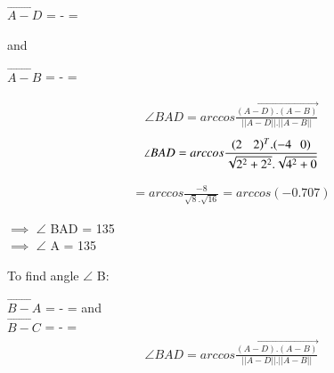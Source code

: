 \documentclass[journal,10pt,twocolumn]{article}
\begin{document}
\begin{flushleft}
\begin{center}
    

$\vec{A-D}$ =  - 
	= 

\begin{flushleft}
and \\
\end{flushleft}


$\vec{A-B}$ =  - = 
	\\

\end{center}
\vspace{0.4cm}
\begin{align}
\angle BAD = arccos \vec{\frac{(A-D).(A-B)}{||A-D ||. ||A-B||}}
\end{align}
\vspace{0.4cm}
\begin{align}
\angle BAD = arccos \frac{(2 \hspace{0.32cm}  2)^T . (-4 \hspace{0.25cm}   0) } {\sqrt{2^2+2^2}.\sqrt{4^2+0}}
\end{align}

\begin{align}
= arccos \frac{-8 } {\sqrt{8}.\sqrt{16}} = arccos (-0.707) 
\end{align}
\begin{flushleft}
$\implies$   $\angle$ BAD = 135 \textdegree\\
\vspace{0.3cm}
$\implies$   $\angle$ A = 135 \textdegree
\end{flushleft}

\vspace{0.5cm}
\begin{flushleft}
To find angle $\angle$ B: \\
\end{flushleft}

\vspace{0.35cm}
$\vec{B-A}$ = -
	= 
and \\

$\vec{B-C}$ =  - =  
\vspace{0.25cm}	
\begin{align}
\angle BAD = arccos \vec {\frac{(A-D).(A-B)}{||A-D||.||A-B||}}
\end{align}


\end{flushleft}
\end{document}
